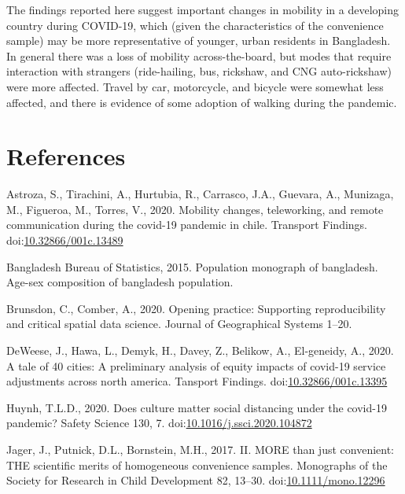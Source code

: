 \documentclass[]{elsarticle} %
\begin{document}
The findings reported here suggest important changes in mobility in a
developing country during COVID-19, which (given the characteristics of
the convenience sample) may be more representative of younger, urban
residents in Bangladesh. In general there was a loss of mobility
across-the-board, but modes that require interaction with strangers
(ride-hailing, bus, rickshaw, and CNG auto-rickshaw) were more affected.
Travel by car, motorcycle, and bicycle were somewhat less affected, and
there is evidence of some adoption of walking during the pandemic.

\hypertarget{references}{%
\section*{References}\label{references}}

\hypertarget{refs}{}
\leavevmode\hypertarget{ref-Astroza2020mobility}{}%
Astroza, S., Tirachini, A., Hurtubia, R., Carrasco, J.A., Guevara, A.,
Munizaga, M., Figueroa, M., Torres, V., 2020. Mobility changes,
teleworking, and remote communication during the covid-19 pandemic in
chile. Transport Findings.
doi:\href{https://doi.org/10.32866/001c.13489}{10.32866/001c.13489}

\leavevmode\hypertarget{ref-Bangladesh2015}{}%
Bangladesh Bureau of Statistics, 2015. Population monograph of
bangladesh. Age-sex composition of bangladesh population.

\leavevmode\hypertarget{ref-Brunsdon2020opening}{}%
Brunsdon, C., Comber, A., 2020. Opening practice: Supporting
reproducibility and critical spatial data science. Journal of
Geographical Systems 1--20.

\leavevmode\hypertarget{ref-DeWeese2020tale}{}%
DeWeese, J., Hawa, L., Demyk, H., Davey, Z., Belikow, A., El-geneidy,
A., 2020. A tale of 40 cities: A preliminary analysis of equity impacts
of covid-19 service adjustments across north america. Tansport Findings.
doi:\href{https://doi.org/10.32866/001c.13395}{10.32866/001c.13395}

\leavevmode\hypertarget{ref-Huynh2020culture}{}%
Huynh, T.L.D., 2020. Does culture matter social distancing under the
covid-19 pandemic? Safety Science 130, 7.
doi:\href{https://doi.org/10.1016/j.ssci.2020.104872}{10.1016/j.ssci.2020.104872}

\leavevmode\hypertarget{ref-Jager2017convenience}{}%
Jager, J., Putnick, D.L., Bornstein, M.H., 2017. II. MORE than just
convenient: THE scientific merits of homogeneous convenience samples.
Monographs of the Society for Research in Child Development 82, 13--30.
doi:\href{https://doi.org/10.1111/mono.12296}{10.1111/mono.12296}
\end{document}

